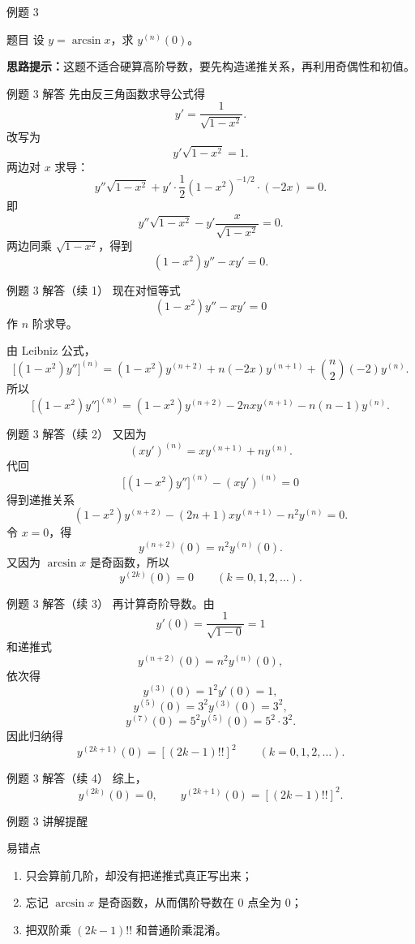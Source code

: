 ﻿\documentclass[aspectratio=169,10pt]{ctexbeamer}
\begin{document}
\begin{frame}[t]{例题 3}
\small
\begin{block}{题目}
设 $y=\arcsin x$，求 $y^{(n)}(0)$。
\end{block}

\vspace{0.4em}
\textbf{思路提示：}这题不适合硬算高阶导数，要先构造递推关系，再利用奇偶性和初值。
\end{frame}

\begin{frame}[t]{例题 3 解答}
\small
先由反三角函数求导公式得
\[
y'=\frac{1}{\sqrt{1-x^2}}.
\]
改写为
\[
y'\sqrt{1-x^2}=1.
\]
两边对 $x$ 求导：
\[
y''\sqrt{1-x^2}+y'\cdot\frac12(1-x^2)^{-1/2}\cdot(-2x)=0.
\]
即
\[
y''\sqrt{1-x^2}-y'\frac{x}{\sqrt{1-x^2}}=0.
\]
两边同乘 $\sqrt{1-x^2}$，得到
\[
(1-x^2)y''-xy'=0.
\]
\end{frame}

\begin{frame}[t]{例题 3 解答（续 1）}
\small
现在对恒等式
\[
(1-x^2)y''-xy'=0
\]
作 $n$ 阶求导。

由 Leibniz 公式，
\[
\bigl[(1-x^2)y''\bigr]^{(n)}
=(1-x^2)y^{(n+2)}+n(-2x)y^{(n+1)}+\binom{n}{2}(-2)y^{(n)}.
\]
所以
\[
\bigl[(1-x^2)y''\bigr]^{(n)}
=(1-x^2)y^{(n+2)}-2nxy^{(n+1)}-n(n-1)y^{(n)}.
\]
\end{frame}

\begin{frame}[t]{例题 3 解答（续 2）}
\small
又因为
\[
(xy')^{(n)}=xy^{(n+1)}+ny^{(n)}.
\]
代回
\[
\bigl[(1-x^2)y''\bigr]^{(n)}-(xy')^{(n)}=0
\]
得到递推关系
\[
(1-x^2)y^{(n+2)}-(2n+1)xy^{(n+1)}-n^2y^{(n)}=0.
\]
令 $x=0$，得
\[
y^{(n+2)}(0)=n^2y^{(n)}(0).
\]
又因为 $\arcsin x$ 是奇函数，所以
\[
y^{(2k)}(0)=0\qquad (k=0,1,2,\dots).
\]
\end{frame}

\begin{frame}[t]{例题 3 解答（续 3）}
\small
再计算奇阶导数。由
\[
y'(0)=\frac{1}{\sqrt{1-0}}=1
\]
和递推式
\[
y^{(n+2)}(0)=n^2y^{(n)}(0),
\]
依次得
\[
y^{(3)}(0)=1^2y'(0)=1,
\]
\[
y^{(5)}(0)=3^2y^{(3)}(0)=3^2,
\]
\[
y^{(7)}(0)=5^2y^{(5)}(0)=5^2\cdot3^2.
\]
因此归纳得
\[
y^{(2k+1)}(0)=[(2k-1)!!]^2\qquad (k=0,1,2,\dots).
\]
\end{frame}

\begin{frame}[t]{例题 3 解答（续 4）}
\small
综上，
\[
\boxed{
y^{(2k)}(0)=0,\qquad
y^{(2k+1)}(0)=[(2k-1)!!]^2.
}
\]
\end{frame}

\begin{frame}[t]{例题 3 讲解提醒}
\small
\begin{block}{易错点}
\begin{enumerate}
  \item 只会算前几阶，却没有把递推式真正写出来；
  \item 忘记 $\arcsin x$ 是奇函数，从而偶阶导数在 $0$ 点全为 $0$；
  \item 把双阶乘 $(2k-1)!!$ 和普通阶乘混淆。
\end{enumerate}
\end{block}
\end{frame}
\end{document}
